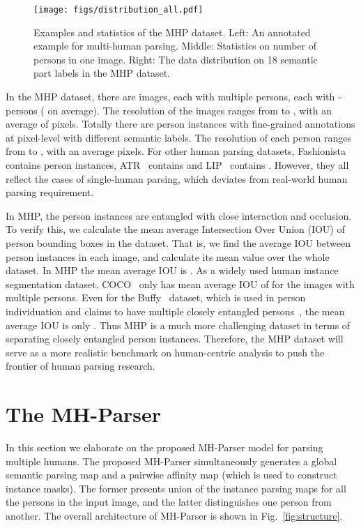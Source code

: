 \documentclass[10pt, letterpaper]{article}
\begin{document}
\begin{figure*}[t!]
    \centering
      \texttt{[image: figs/distribution\_all.pdf]} 
        \caption{Examples and statistics of the MHP dataset. Left: An annotated example for multi-human parsing. Middle: Statistics on number of persons in one image. Right: The data distribution on 18 semantic part labels in the MHP dataset.} \label{fig:num_stats}
\end{figure*}

In the MHP dataset, there are  images, each with multiple persons, each with - persons ( on average). The resolution of the images ranges from  to , with an average of  pixels. Totally there are  person instances with fine-grained annotations at pixel-level with  different  semantic labels. The resolution of each person ranges from  to , with an average  pixels. For other human parsing datasets, Fashionista~\cite{yamaguchi2012parsing}  contains  person instances, ATR~\cite{liang2015human} contains  and LIP~\cite{gong2017look}  contains . However, they all reflect the cases of single-human parsing, which deviates from real-world human parsing requirement. 

In MHP, the person instances are entangled with close interaction and occlusion. To verify this, we calculate the mean average Intersection Over Union (IOU) of person bounding boxes in the dataset. That is, we find the average IOU between person instances in each image, and calculate its mean value over the whole dataset. In MHP the mean average IOU is . As a widely used  human instance segmentation dataset, COCO~\cite{lin2014microsoft} only has mean average IOU of  for the images with multiple persons. Even for the Buffy~\cite{vineet2011human} dataset, which is used in person individuation and claims to have multiple closely entangled persons~\cite{jiang2017detangling}, the mean average IOU is only . Thus  MHP is a much more challenging dataset in terms of separating closely entangled person instances. Therefore, the MHP dataset will serve as a more realistic benchmark on human-centric analysis to push the frontier of human parsing research. 


\section{The MH-Parser}
In this section we elaborate on the proposed MH-Parser model for parsing multiple humans. The proposed MH-Parser simultaneously generates a global semantic parsing map and a pairwise affinity map (which is used to construct instance masks). The former presents  union of the instance parsing maps for all the persons in the input image, and the latter distinguishes one person from another. The overall architecture of MH-Parser is shown in Fig.~\ref{fig:structure}. 
\end{document}

